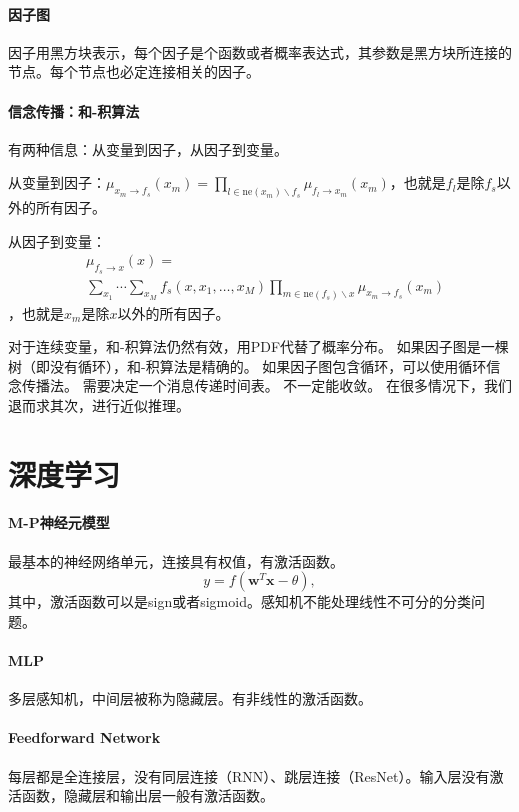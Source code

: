 \paragraph{因子图}
因子用黑方块表示，每个因子是个函数或者概率表达式，其参数是黑方块所连接的节点。每个节点也必定连接相关的因子。

\paragraph{信念传播：和-积算法}
有两种信息：从变量到因子，从因子到变量。

从变量到因子：$\mu_{x_m \to f_s}(x_m) = \prod_{l \in \mathrm{ne}(x_m) \backslash f_s} \mu_{f_l \to x_m}(x_m)$，也就是$f_l$是除$f_s$以外的所有因子。

从因子到变量：$$
\begin{aligned}
&\mu_{f_s \to x}(x) = \\
&\sum_{x_1}\! \cdots\! \sum_{x_M}\! f_s(x,x_1,\! \ldots,\! x_M)\! \prod_{m \in \mathrm{ne}(f_s)\! \backslash\!  x}\! \mu_{x_m\! \to\! f_s}(x_m)
\end{aligned}
$$，也就是$x_m$是除$x$以外的所有因子。

对于连续变量，和-积算法仍然有效，用PDF代替了概率分布。
如果因子图是一棵树（即没有循环），和-积算法是精确的。
如果因子图包含循环，可以使用循环信念传播法。
需要决定一个消息传递时间表。
不一定能收敛。
在很多情况下，我们退而求其次，进行近似推理。

\section{深度学习}
\paragraph{M-P神经元模型}
最基本的神经网络单元，连接具有权值，有激活函数。
$$y = f(\bm w^T\bm x - \theta),$$
其中，激活函数可以是sign或者sigmoid。感知机不能处理线性不可分的分类问题。

\paragraph{MLP}
多层感知机，中间层被称为隐藏层。有非线性的激活函数。

\paragraph{Feedforward Network}
每层都是全连接层，没有同层连接（RNN）、跳层连接（ResNet）。输入层没有激活函数，隐藏层和输出层一般有激活函数。

